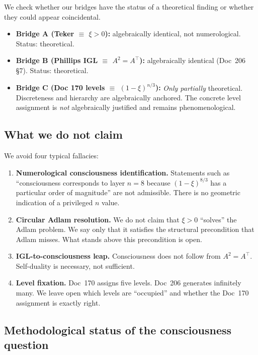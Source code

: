 We check whether our bridges have the status of a theoretical finding or whether they could appear coincidental.

\begin{itemize}
\item \textbf{Bridge A (Teker $\equiv$ $\xi > 0$):} algebraically identical, not numerological. Status: theoretical.
\item \textbf{Bridge B (Phillips IGL $\equiv$ $A^2 = A^\top$):} algebraically identical (Doc~206 \S7). Status: theoretical.
\item \textbf{Bridge C (Doc 170 levels $\equiv$ $(1-\xi)^{n/3}$):} \emph{Only partially} theoretical. Discreteness and hierarchy are algebraically anchored. The concrete level assignment is \emph{not} algebraically justified and remains phenomenological.
\end{itemize}

\subsection{What we do not claim}

We avoid four typical fallacies:

\begin{enumerate}
\item \textbf{Numerological consciousness identification.} Statements such as ``consciousness corresponds to layer $n = 8$ because $(1-\xi)^{8/3}$ has a particular order of magnitude'' are not admissible. There is no geometric indication of a privileged $n$ value.
\item \textbf{Circular Adlam resolution.} We do not claim that $\xi > 0$ ``solves'' the Adlam problem. We say only that it satisfies the structural precondition that Adlam misses. What stands above this precondition is open.
\item \textbf{IGL-to-consciousness leap.} Consciousness does not follow from $A^2 = A^\top$. Self-duality is necessary, not sufficient.
\item \textbf{Level fixation.} Doc~170 assigns five levels. Doc~206 generates infinitely many. We leave open which levels are ``occupied'' and whether the Doc~170 assignment is exactly right.
\end{enumerate}

\subsection{Methodological status of the consciousness question}

